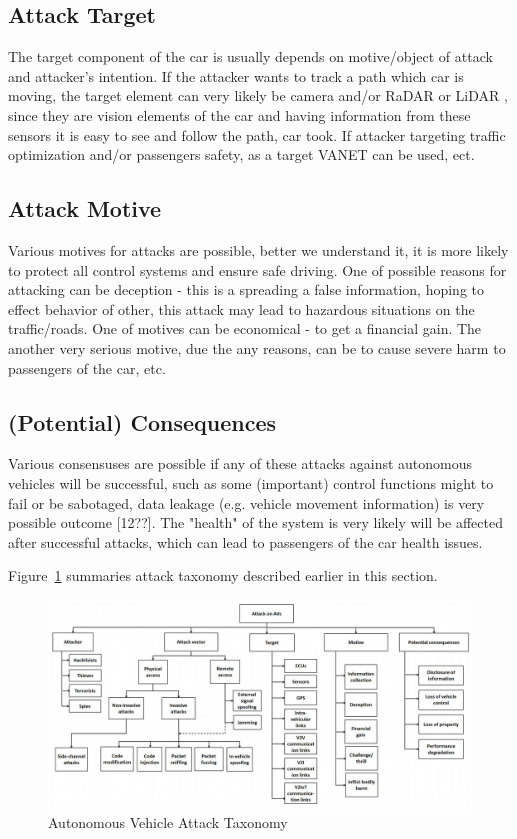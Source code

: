 \subsection{Attack Target}

The target component of the car is usually depends on motive/object of attack and attacker’s intention. If the attacker wants to track a path which car is moving, the target element can very likely be camera and/or \gls{RaDAR} or \gls{LiDAR} , since they are vision elements of the car and having information from these sensors it is easy to see and follow the path, car took. If attacker targeting traffic optimization and/or passengers safety, as a target \gls{VANET} can be used, ect.

\subsection{Attack Motive}

Various motives for attacks are possible, better we understand it, it is more likely to protect all control systems and ensure safe driving. One of possible reasons for attacking can be deception - this is a spreading a false information, hoping to effect behavior of other, this attack may lead to hazardous situations on the traffic/roads. One of motives can be economical - to get a financial gain. The another very serious motive, due the any reasons, can be to cause severe harm to passengers of the car, etc.

\subsection{(Potential) Consequences}

Various consensuses are possible if any of these attacks against autonomous vehicles will be successful, such as some (important) control functions might to fail or be sabotaged, data leakage (e.g. vehicle movement information) is very possible outcome [12??]. The "health" of the system is very likely will be affected after successful attacks, which can lead to passengers of the car health issues.


Figure~\ref{fig:AttackTaxonomy} summaries attack taxonomy described earlier in this section.

\begin{figure}[h]
	\centering  	
	\includegraphics[width=15cm]{img/6.jpg}
	\caption{Autonomous Vehicle Attack Taxonomy \cite{sec}}
	\label{fig:AttackTaxonomy}    
\end{figure}

